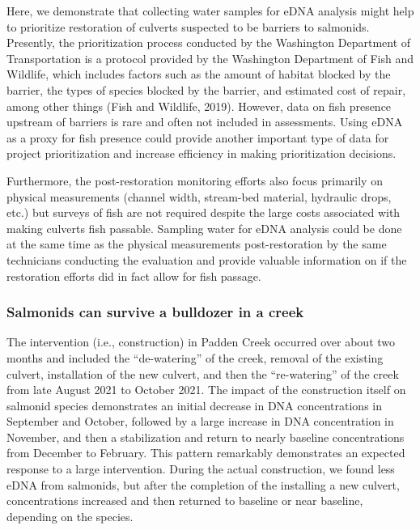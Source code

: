\documentclass[
]{article}
\begin{document}
Here, we demonstrate that collecting water samples for eDNA analysis
might help to prioritize restoration of culverts suspected to be
barriers to salmonids. Presently, the prioritization process conducted
by the Washington Department of Transportation is a protocol provided by
the Washington Department of Fish and Wildlife, which includes factors
such as the amount of habitat blocked by the barrier, the types of
species blocked by the barrier, and estimated cost of repair, among
other things (Fish and Wildlife, 2019). However, data on fish presence
upstream of barriers is rare and often not included in assessments.
Using eDNA as a proxy for fish presence could provide another important
type of data for project prioritization and increase efficiency in
making prioritization decisions.

Furthermore, the post-restoration monitoring efforts also focus
primarily on physical measurements (channel width, stream-bed material,
hydraulic drops, etc.) but surveys of fish are not required despite the
large costs associated with making culverts fish passable. Sampling
water for eDNA analysis could be done at the same time as the physical
measurements post-restoration by the same technicians conducting the
evaluation and provide valuable information on if the restoration
efforts did in fact allow for fish passage.

\hypertarget{salmonids-can-survive-a-bulldozer-in-a-creek}{%
\subsubsection{Salmonids can survive a bulldozer in a
creek}\label{salmonids-can-survive-a-bulldozer-in-a-creek}}

The intervention (i.e., construction) in Padden Creek occurred over
about two months and included the ``de-watering'' of the creek, removal
of the existing culvert, installation of the new culvert, and then the
``re-watering'' of the creek from late August 2021 to October 2021. The
impact of the construction itself on salmonid species demonstrates an
initial decrease in DNA concentrations in September and October,
followed by a large increase in DNA concentration in November, and then
a stabilization and return to nearly baseline concentrations from
December to February. This pattern remarkably demonstrates an expected
response to a large intervention. During the actual construction, we
found less eDNA from salmonids, but after the completion of the
installing a new culvert, concentrations increased and then returned to
baseline or near baseline, depending on the species.
\end{document}
